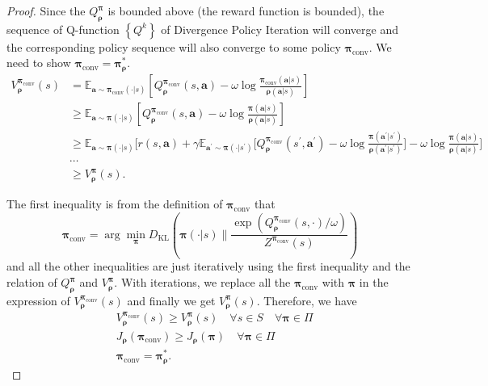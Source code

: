 \documentclass{article}
\begin{document}
\begin{proof}
		Since the $Q^{\bm{\pi}}_{\bm{\rho}}$ is bounded above (the reward function is bounded), the sequence of Q-function $\left\{Q^{k}\right\}$ of Divergence Policy Iteration will converge and the corresponding policy sequence will also converge to some policy $\bm{\pi}_{\operatorname{conv}}$. We need to show $\bm{\pi}_{\operatorname{conv}} = \bm{\pi}^{*}_{\bm{\rho}}$.
		\begin{align*}
			V^{\bm{\pi}_{\operatorname{conv}}}_{\bm{\rho}}(s) & = \mathbb{E}_{\bm{a} \sim \bm{\pi}_{\operatorname{conv}}(\cdot | s) } \left[ 
			Q^{\bm{\pi}_{\operatorname{conv}}}_{\bm{\rho}}(s,\bm{a}) - \omega \log \frac{{\bm{\pi}_{\operatorname{conv}}}(\bm{a}|s)}{{\bm{\rho}}(\bm{a}|s)}
			\right] \\
			& \geq \mathbb{E}_{\bm{a} \sim \bm{\pi}(\cdot | s) } \left[ 
			Q^{\bm{\pi}_{\operatorname{conv}}}_{\bm{\rho}}(s,\bm{a}) - \omega \log \frac{{\bm{\pi}}(\bm{a}|s)}{{\bm{\rho}}(\bm{a}|s)}
			\right] \\
			& \geq \mathbb{E}_{\bm{a} \sim \bm{\pi}(\cdot | s) }  \bigg[ 
			r(s,\bm{a}) + \gamma \mathbb{E}_{\bm{a^{\prime}} \sim \bm{\pi}(\cdot | s^{\prime}) } \bigg[ Q^{\bm{\pi}_{\operatorname{conv}}}_{\bm{\rho}}(s^{\prime},\bm{a}^{\prime}) - \omega \log \frac{{\bm{\pi}}(\bm{a}^{\prime}|s^{\prime})}{{\bm{\rho}}(\bm{a}^{\prime}|s^{\prime})} \bigg] -\omega \log \frac{{\bm{\pi}}(\bm{a}|s)}{{\bm{\rho}}(\bm{a}|s)}
			\bigg] \\
			& \cdots \\
			& \geq V^{\bm{\pi}}_{\bm{\rho}}(s) .
		\end{align*}
		
		The first inequality is from the definition of $\bm{\pi}_{\operatorname{conv}}$ that 
		\[{\bm{\pi}}_{\operatorname{conv}} = \arg \min_{\bm{\pi}} D_{\operatorname{KL}}\left( {\bm{\pi}}(\cdot|s) \|  \frac{\exp\left( Q^{{\bm{\pi}}_{\operatorname{{conv}}}}_{\bm{\rho}}(s,\cdot) / \omega \right)}{Z^{{\bm{\pi}}_{\operatorname{{conv}}}}(s)} \right)\]
		and all the other inequalities are just iteratively using the first inequality and the relation of $Q^{\bm{\pi}}_{\bm{\rho}}$ and $V^{\bm{\pi}}_{\bm{\rho}}$. With iterations, we replace all the $\bm{\pi}_{\operatorname{conv}}$ with  $\bm{\pi}$ in the expression of $V^{\bm{\pi}_{\operatorname{conv}}}_{\bm{\rho}}(s)$ and finally we get $V^{\bm{\pi}}_{\bm{\rho}}(s)$.
		Therefore, we have
		\begin{align*}
			& V_{\bm{\rho}}^{\bm{\pi}_{\operatorname{conv}}}(s) \ge V_{\bm{\rho}}^{\bm{\pi}}(s) \quad \forall s \in S \quad \forall \bm{\pi} \in \Pi \\
			& J_{\bm{\rho}}(\bm{\pi}_{\operatorname{conv}}) \ge J_{\bm{\rho}}(\bm{\pi}) \quad \forall \bm{\pi} \in \Pi \\ 
			& \bm{\pi}_{\operatorname{conv}} = \bm{\pi}^{*}_{\bm{\rho}}.
		\end{align*}
	\end{proof}
	
\end{document}
